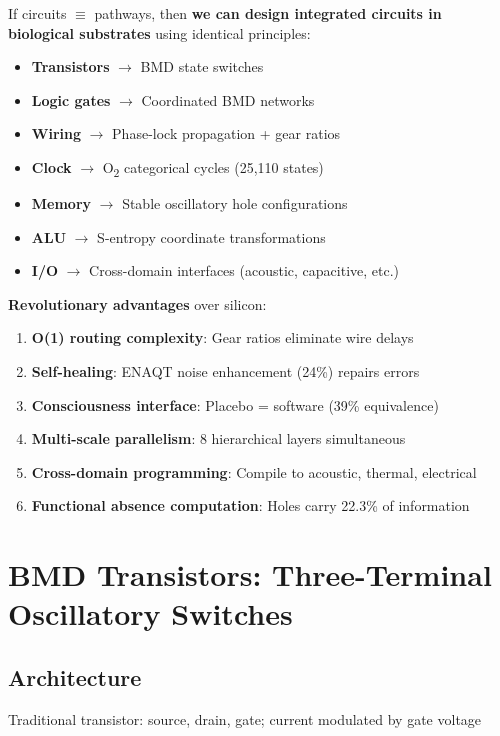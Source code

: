 \documentclass[11pt,a4paper]{article}
\begin{document}
If circuits $\equiv$ pathways, then \textbf{we can design integrated circuits in biological substrates} using identical principles:

\begin{itemize}
\item \textbf{Transistors} $\rightarrow$ BMD state switches
\item \textbf{Logic gates} $\rightarrow$ Coordinated BMD networks
\item \textbf{Wiring} $\rightarrow$ Phase-lock propagation + gear ratios
\item \textbf{Clock} $\rightarrow$ O\textsubscript{2} categorical cycles (25,110 states)
\item \textbf{Memory} $\rightarrow$ Stable oscillatory hole configurations
\item \textbf{ALU} $\rightarrow$ S-entropy coordinate transformations
\item \textbf{I/O} $\rightarrow$ Cross-domain interfaces (acoustic, capacitive, etc.)
\end{itemize}

\textbf{Revolutionary advantages} over silicon:
\begin{enumerate}
\item \textbf{O(1) routing complexity}: Gear ratios eliminate wire delays
\item \textbf{Self-healing}: ENAQT noise enhancement (24\%) repairs errors
\item \textbf{Consciousness interface}: Placebo = software (39\% equivalence)
\item \textbf{Multi-scale parallelism}: 8 hierarchical layers simultaneous
\item \textbf{Cross-domain programming}: Compile to acoustic, thermal, electrical
\item \textbf{Functional absence computation}: Holes carry 22.3\% of information
\end{enumerate}

\section{BMD Transistors: Three-Terminal Oscillatory Switches}

\subsection{Architecture}

Traditional transistor: source, drain, gate; current modulated by gate voltage
\end{document}
